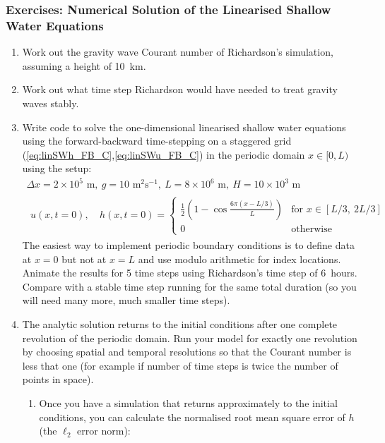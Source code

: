\subsubsection{Exercises: Numerical Solution of the Linearised Shallow Water Equations}\label{ex:explicitSWE}
\begin{enumerate}
\item Work out the gravity wave Courant number of Richardson's simulation,
assuming a height of 10~km. 
\item Work out what time step Richardson would have needed to treat gravity
waves stably.
\item Write code to solve the one-dimensional linearised shallow water equations
using the forward-backward time-stepping on a staggered grid (\ref{eq:linSWh_FB_C},\ref{eq:linSWu_FB_C})
in the periodic domain $x\in[0,L)$ using the setup:
\[
\begin{array}{c}
\Delta x=2\times10^{5}\text{ m},\ g=10\text{ m}^{2}\text{s}^{-1},\ L=8\times10^{6}\text{ m},\ H=10\times10^{3}\text{ m}\\
\begin{array}{cc}
u\left(x,t=0\right),\  & h\left(x,t=0\right)=\begin{cases}
\frac{1}{2}\left(1-\cos\frac{6\pi\left(x-L/3\right)}{L}\right) & \text{for }x\in\left[L/3,\ 2L/3\right]\\
0 & \text{otherwise}
\end{cases}\end{array}
\end{array}
\]
The easiest way to implement periodic boundary conditions is to define
data at $x=0$ but not at $x=L$ and use modulo arithmetic for index
locations. Animate the results for 5 time steps using Richardson's
time step of 6~hours. Compare with a stable time step running for
the same total duration (so you will need many more, much smaller
time steps).
\item The analytic solution returns to the initial conditions after one
complete revolution of the periodic domain. Run your model for exactly
one revolution by choosing spatial and temporal resolutions so that
the Courant number is less that one (for example if number of time
steps is twice the number of points in space). 
\begin{enumerate}
\item Once you have a simulation that returns approximately to the initial
conditions, you can calculate the normalised root mean square error
of $h$ (the $\ell_{2}$ error norm):
\begin{equation}

\end{equation}
\end{enumerate}
\end{enumerate}
